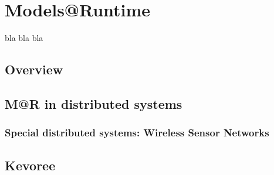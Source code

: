 \chapter{Models@Runtime}
\label{sec:MAR}
bla bla bla

\section{Overview}

\section{M@R in distributed systems}

\subsection{Special distributed systems: Wireless Sensor Networks}

\section{Kevoree}